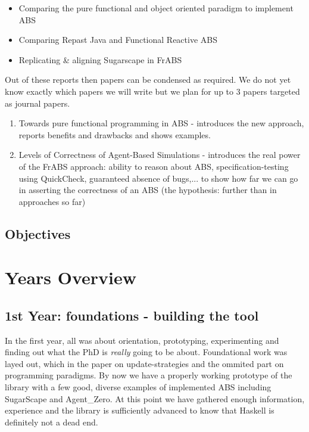 \begin{itemize}
	\item Comparing the pure functional and object oriented paradigm to implement ABS
	\item Comparing Repast Java and Functional Reactive ABS
	\item Replicating \& aligning Sugarscape in FrABS 
\end{itemize}

Out of these reports then papers can be condensed as required. We do not yet know exactly which papers we will write but we plan for up to 3 papers targeted as journal papers.

\begin{enumerate}
	\item Towards pure functional programming in ABS - introduces the new approach, reports benefits and drawbacks and shows examples.
	\item Levels of Correctness of Agent-Based Simulations - introduces the real power of the FrABS approach: ability to reason about ABS, specification-testing using QuickCheck, guaranteed absence of bugs,... to show how far we can go in asserting the correctness of an ABS (the hypothesis: further than in approaches so far)
\end{enumerate}

\subsection{Objectives}


\section{Years Overview}

\subsection{1st Year: foundations - building the tool}
In the first year, all was about orientation, prototyping, experimenting and finding out what the PhD is \textit{really} going to be about. Foundational work was layed out, which in the paper on update-strategies and the ommited part on programming paradigms. By now we have a properly working prototype of the library with a few good, diverse examples of implemented ABS including SugarScape and Agent\_Zero. At this point we have gathered enough information, experience and the library is sufficiently advanced to know that Haskell is definitely not a dead end.

